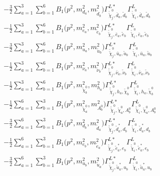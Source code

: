 \begin{itemize}
\begin{align}
 &-\frac{3}{2} \sum_{a=1}^{3}\sum_{b=1}^{6}{B_1\Big(p^{2},m^2_{d_{{a}}},m^2_{\tilde{d}_{{b}}}\Big)} {\Gamma^{L*}_{\check{\tilde{\chi}}^0_{{j}},\bar{d}_{{a}},\tilde{d}_{{b}}}} {\Gamma^L_{\check{\tilde{\chi}}^0_{{i}},\bar{d}_{{a}},\tilde{d}_{{b}}}}  \nonumber \\ 
 &-\frac{1}{2} \sum_{a=1}^{3}\sum_{b=1}^{6}{B_1\Big(p^{2},m^2_{e_{{a}}},m^2_{\tilde{e}_{{b}}}\Big)} {\Gamma^{L*}_{\check{\tilde{\chi}}^0_{{j}},\bar{e}_{{a}},\tilde{e}_{{b}}}} {\Gamma^L_{\check{\tilde{\chi}}^0_{{i}},\bar{e}_{{a}},\tilde{e}_{{b}}}}  \nonumber \\ 
 &-\frac{3}{2} \sum_{a=1}^{3}\sum_{b=1}^{6}{B_1\Big(p^{2},m^2_{u_{{a}}},m^2_{\tilde{u}_{{b}}}\Big)} {\Gamma^{L*}_{\check{\tilde{\chi}}^0_{{j}},\bar{u}_{{a}},\tilde{u}_{{b}}}} {\Gamma^L_{\check{\tilde{\chi}}^0_{{i}},\bar{u}_{{a}},\tilde{u}_{{b}}}}  \nonumber \\ 
 &-\frac{1}{2} \sum_{a=1}^{3}\sum_{b=1}^{6}{B_1\Big(p^{2},m^2_{\nu_{{a}}},m^2_{\tilde{\nu}_{{b}}}\Big)} {\Gamma^{L*}_{\check{\tilde{\chi}}^0_{{j}},\bar{\nu}_{{a}},\tilde{\nu}_{{b}}}} {\Gamma^L_{\check{\tilde{\chi}}^0_{{i}},\bar{\nu}_{{a}},\tilde{\nu}_{{b}}}}  \nonumber \\ 
 &-\frac{1}{2} \sum_{a=1}^{3}\sum_{b=1}^{6}{B_1\Big(p^{2},m^2_{\tilde{\chi}^0_{{b}}},m^2_{h_{{a}}}\Big)} {\Gamma^{L*}_{\check{\tilde{\chi}}^0_{{j}},h_{{a}},\tilde{\chi}^0_{{b}}}} {\Gamma^L_{\check{\tilde{\chi}}^0_{{i}},h_{{a}},\tilde{\chi}^0_{{b}}}}  \nonumber \\ 
 &-\frac{1}{2} \sum_{a=1}^{6}\sum_{b=1}^{3}{B_1\Big(p^{2},m^2_{\tilde{\chi}^0_{{a}}},m^2_{A^0_{{b}}}\Big)} {\Gamma^{L*}_{\check{\tilde{\chi}}^0_{{j}},\tilde{\chi}^0_{{a}},A^0_{{b}}}} {\Gamma^L_{\check{\tilde{\chi}}^0_{{i}},\tilde{\chi}^0_{{a}},A^0_{{b}}}}  \nonumber \\ 
 &-\frac{3}{2} \sum_{a=1}^{6}\sum_{b=1}^{3}{B_1\Big(p^{2},m^2_{d_{{b}}},m^2_{\tilde{d}_{{a}}}\Big)} {\Gamma^{L*}_{\check{\tilde{\chi}}^0_{{j}},\tilde{d}^*_{{a}},d_{{b}}}} {\Gamma^L_{\check{\tilde{\chi}}^0_{{i}},\tilde{d}^*_{{a}},d_{{b}}}}  \nonumber \\ 
 &-\frac{1}{2} \sum_{a=1}^{6}\sum_{b=1}^{3}{B_1\Big(p^{2},m^2_{e_{{b}}},m^2_{\tilde{e}_{{a}}}\Big)} {\Gamma^{L*}_{\check{\tilde{\chi}}^0_{{j}},\tilde{e}^*_{{a}},e_{{b}}}} {\Gamma^L_{\check{\tilde{\chi}}^0_{{i}},\tilde{e}^*_{{a}},e_{{b}}}}  \nonumber \\ 
 &-\frac{3}{2} \sum_{a=1}^{6}\sum_{b=1}^{3}{B_1\Big(p^{2},m^2_{u_{{b}}},m^2_{\tilde{u}_{{a}}}\Big)} {\Gamma^{L*}_{\check{\tilde{\chi}}^0_{{j}},\tilde{u}^*_{{a}},u_{{b}}}} {\Gamma^L_{\check{\tilde{\chi}}^0_{{i}},\tilde{u}^*_{{a}},u_{{b}}}}  \nonumber \\ 

\end{align}
\end{itemize}
